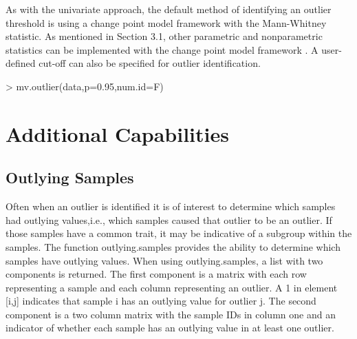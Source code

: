 \documentclass[11pt, a4paper]{article}
\begin{document}
As with the univariate approach, the default method of identifying an outlier threshold is using a change point model framework with the Mann-Whitney statistic. As mentioned in Section 3.1, other parametric and nonparametric statistics can be implemented with the change point model framework \cite{cpm}. A user-defined cut-off can also be specified for outlier identification.
\begin{Schunk}
\begin{Sinput}
> mv.outlier(data,p=0.95,num.id=F)
\end{Sinput}
\end{Schunk}
\section{Additional Capabilities}
\subsection{Outlying Samples}
Often when an outlier is identified it is of interest to determine which samples had outlying values,i.e., which samples caused that outlier to be an outlier. If those samples have a common trait, it may be indicative of a subgroup within the samples. The function outlying.samples provides the ability to determine which samples have outlying values. When using outlying.samples, a list with two components is returned. The first component is a matrix with each row representing a sample and each column representing an outlier. A 1 in element [i,j] indicates that sample i has an outlying value for outlier j. The second component is a two column matrix with the sample IDs in column one and an indicator of whether each sample has an outlying value in at least one outlier.
\end{document}
